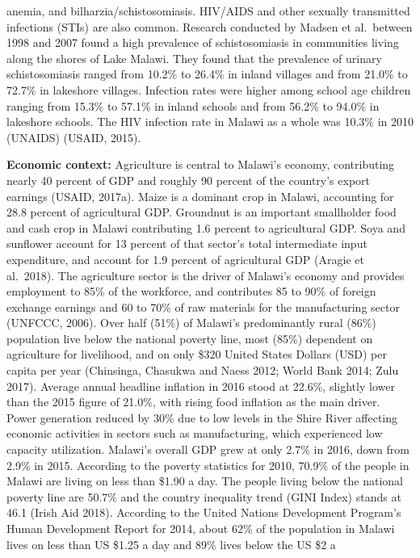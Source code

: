 \documentclass[
]{book}
\begin{document}
anemia, and bilharzia/schistosomiasis. HIV/AIDS and other sexually transmitted infections (STIs) are also common. Research conducted by Madsen et al.~between
1998 and 2007 found a high prevalence of schistosomiasis in communities living along the shores of Lake Malawi. They found that the prevalence of urinary
schistosomiasis ranged from 10.2\% to 26.4\% in inland villages and from 21.0\% to 72.7\% in lakeshore villages. Infection rates were higher among school age
children ranging from 15.3\% to 57.1\% in inland schools and from 56.2\% to 94.0\% in lakeshore schools. The HIV infection rate in Malawi as a whole was 10.3\% in
2010 (UNAIDS) (USAID, 2015).

\textbf{Economic context:} Agriculture is central to Malawi's economy, contributing nearly 40 percent of GDP and roughly 90 percent of the country's export earnings
(USAID, 2017a). Maize is a dominant crop in Malawi, accounting for 28.8 percent of agricultural GDP. Groundnut is an important smallholder food and cash crop in
Malawi contributing 1.6 percent to agricultural GDP. Soya and sunflower account for 13 percent of that sector's total intermediate input expenditure, and account
for 1.9 percent of agricultural GDP (Aragie et al.~2018). The agriculture sector is the driver of Malawi's economy and provides employment to 85\% of the
workforce, and contributes 85 to 90\% of foreign exchange earnings and 60 to 70\% of raw materials for the manufacturing sector (UNFCCC, 2006). Over half (51\%) of
Malawi's predominantly rural (86\%) population live below the national poverty line, most (85\%) dependent on agriculture for livelihood, and on only \$320 United
States Dollars (USD) per capita per year (Chinsinga, Chasukwa and Naess 2012; World Bank 2014; Zulu 2017). Average annual headline inflation in 2016 stood at
22.6\%, slightly lower than the 2015 figure of 21.0\%, with rising food inflation as the main driver. Power generation reduced by 30\% due to low levels in the
Shire River affecting economic activities in sectors such as manufacturing, which experienced low capacity utilization. Malawi's overall GDP grew at only 2.7\% in
2016, down from 2.9\% in 2015. According to the poverty statistics for 2010, 70.9\% of the people in Malawi are living on less than \$1.90 a day. The people living
below the national poverty line are 50.7\% and the country inequality trend (GINI Index) stands at 46.1 (Irish Aid 2018). According to the United Nations
Development Program's Human Development Report for 2014, about 62\% of the population in Malawi lives on less than US \$1.25 a day and 89\% lives below the US \$2 a
\end{document}
